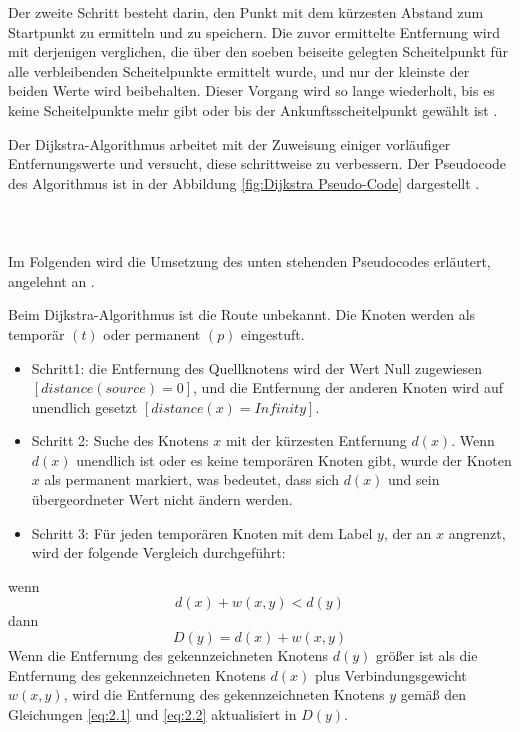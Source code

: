 Der zweite Schritt besteht darin, den Punkt mit dem kürzesten Abstand zum Startpunkt zu ermitteln und zu speichern. Die zuvor ermittelte 
Entfernung wird mit derjenigen verglichen, die über den soeben beiseite gelegten Scheitelpunkt für alle verbleibenden Scheitelpunkte 
ermittelt wurde, und nur der kleinste der beiden Werte wird beibehalten. Dieser Vorgang wird so lange wiederholt, bis es keine Scheitelpunkte
mehr gibt oder bis der Ankunftsscheitelpunkt gewählt ist \cite{Zhou:19}.

Der Dijkstra-Algorithmus arbeitet mit der Zuweisung einiger vorläufiger Entfernungswerte und versucht, diese schrittweise zu verbessern.
Der Pseudocode des Algorithmus ist in der Abbildung \ref{fig:Dijkstra Pseudo-Code}  dargestellt \cite{Huang2012}.
\\ \\
\\ \\
Im Folgenden wird die Umsetzung des unten stehenden Pseudocodes erläutert, angelehnt an \cite{Abusalim2020}.

Beim Dijkstra-Algorithmus ist die Route unbekannt. Die Knoten werden als temporär $(t)$ oder permanent $(p)$ eingestuft.
\begin{itemize}
	\item Schritt1: die Entfernung des Quellknotens wird der Wert Null zugewiesen $[distance (source) = 0]$, und die Entfernung der anderen
		Knoten wird auf unendlich gesetzt $[distance(x) = Infinity]$.
	\item Schritt 2: Suche des Knotens $x$ mit der kürzesten Entfernung $d(x)$. Wenn $d(x)$ unendlich ist oder es keine temporären Knoten gibt,
		wurde der Knoten $x$ als permanent markiert, was bedeutet, dass sich $d(x)$ und sein übergeordneter Wert nicht ändern werden.
	\item Schritt 3: Für jeden temporären Knoten mit dem Label $y$, der an $x$ angrenzt, wird der folgende Vergleich durchgeführt:

	
\end{itemize}
wenn
\begin{equation} \label{eq:2.1}
	d(x) + w (x, y) < d(y)	
\end{equation}
dann
\begin{equation} \label{eq:2.2}
	D(y) = d(x) + w (x, y)
\end{equation}
\newline
Wenn die Entfernung des gekennzeichneten Knotens $d(y)$ größer ist als die Entfernung des gekennzeichneten Knotens $d(x)$ plus Verbindungsgewicht $w(x, y)$, 
wird die Entfernung des gekennzeichneten Knotens $y$ gemäß den Gleichungen \ref{eq:2.1} und \ref{eq:2.2} aktualisiert in $D(y)$.

